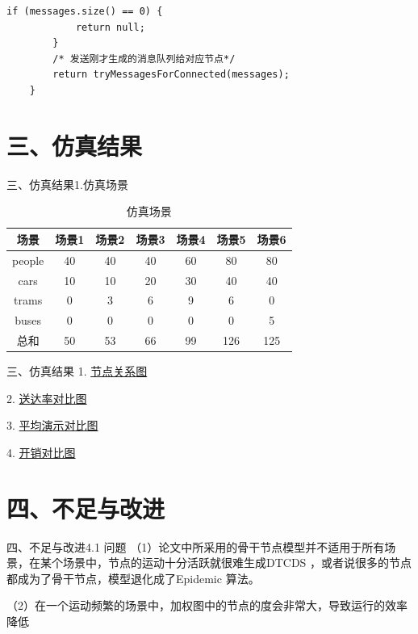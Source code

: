 \documentclass[12pt,aspectratio=43,table]{beamer}
\begin{document}
\begin{frame}[fragile]
\begin{lstlisting}
if (messages.size() == 0) {
            return null;
        }
        /* 发送刚才生成的消息队列给对应节点*/
        return tryMessagesForConnected(messages);
    }
\end{lstlisting}
\end{frame}

\section{三、仿真结果}
\begin{frame}{三、仿真结果}{1.仿真场景}
\begin{table}
  \centering
  \begin{tabular}{|c|c|c|c|c|c|c|}
		\hline  %
		场景&场景1&场景2&场景3&场景4&场景5&场景6 \\  %
		\hline
		people&40&40&40&60&80&80 \\
		\hline
		cars&10&10&20&30&40&40 \\
		\hline
        trams&0&3&6&9&6&0 \\
		\hline
        buses&0&0&0&0&0&5 \\
		\hline
        总和&50&53&66&99&126&125 \\
		\hline
	\end{tabular}
  \caption{仿真场景}\label{table1}
\end{table}
\end{frame}

\begin{frame}{三、仿真结果}
1. \href{http://rocksugar.work/iot/NodeNetwork.html}{节点关系图}

2. \href{http://rocksugar.work/iot/DeliveryProbability.html}{送达率对比图}

3. \href{http://rocksugar.work/iot/Latency.html}{平均演示对比图}

4. \href{http://rocksugar.work/iot/OverheadRatio.html}{开销对比图}
\end{frame}

\section{四、不足与改进}
\begin{frame}{四、不足与改进}{4.1 问题}
（1）论文中所采用的骨干节点模型并不适用于所有场景，在某个场景中，节点的运动十分活跃就很难生成DTCDS ，或者说很多的节点都成为了骨干节点，模型退化成了Epidemic 算法。

（2）在一个运动频繁的场景中，加权图中的节点的度会非常大，导致运行的效率降低
\end{frame}
\end{document}
